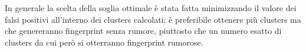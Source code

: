In generale la scelta della soglia ottimale è stata fatta minimizzando il valore dei falsi positivi all'interno dei clusters calcolati; è preferibile ottenere più clusters ma che genereranno fingerprint senza rumore, piuttosto che un numero esatto di clusters da cui però si otterranno fingerprint rumorose.
